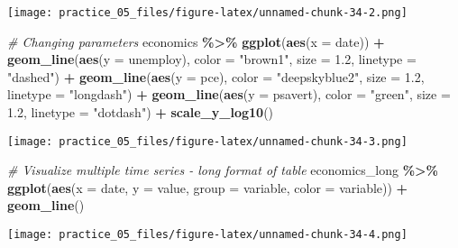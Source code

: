 \documentclass[
]{article}
\newenvironment{Shaded}{\begin{snugshade}}{\end{snugshade}}
\newcommand{\AttributeTok}[1]{\textcolor[rgb]{0.13,0.29,0.53}{#1}}
\newcommand{\CommentTok}[1]{\textcolor[rgb]{0.56,0.35,0.01}{\textit{#1}}}
\newcommand{\FloatTok}[1]{\textcolor[rgb]{0.00,0.00,0.81}{#1}}
\newcommand{\FunctionTok}[1]{\textcolor[rgb]{0.13,0.29,0.53}{\textbf{#1}}}
\newcommand{\NormalTok}[1]{#1}
\newcommand{\SpecialCharTok}[1]{\textcolor[rgb]{0.81,0.36,0.00}{\textbf{#1}}}
\newcommand{\StringTok}[1]{\textcolor[rgb]{0.31,0.60,0.02}{#1}}
\begin{document}
\texttt{[image: practice\_05\_files/figure-latex/unnamed-chunk-34-2.png]}

\begin{Shaded}
\begin{Highlighting}[]
\CommentTok{\# Changing parameters}
\NormalTok{economics }\SpecialCharTok{\%\textgreater{}\%} 
  \FunctionTok{ggplot}\NormalTok{(}\FunctionTok{aes}\NormalTok{(}\AttributeTok{x =}\NormalTok{ date)) }\SpecialCharTok{+}
  \FunctionTok{geom\_line}\NormalTok{(}\FunctionTok{aes}\NormalTok{(}\AttributeTok{y =}\NormalTok{ unemploy), }\AttributeTok{color =} \StringTok{"brown1"}\NormalTok{, }\AttributeTok{size =} \FloatTok{1.2}\NormalTok{, }\AttributeTok{linetype =} \StringTok{"dashed"}\NormalTok{) }\SpecialCharTok{+}
  \FunctionTok{geom\_line}\NormalTok{(}\FunctionTok{aes}\NormalTok{(}\AttributeTok{y =}\NormalTok{ pce),      }\AttributeTok{color =} \StringTok{"deepskyblue2"}\NormalTok{, }\AttributeTok{size =} \FloatTok{1.2}\NormalTok{, }\AttributeTok{linetype =} \StringTok{"longdash"}\NormalTok{) }\SpecialCharTok{+}
  \FunctionTok{geom\_line}\NormalTok{(}\FunctionTok{aes}\NormalTok{(}\AttributeTok{y =}\NormalTok{ psavert),  }\AttributeTok{color =} \StringTok{"green"}\NormalTok{, }\AttributeTok{size =} \FloatTok{1.2}\NormalTok{, }\AttributeTok{linetype =} \StringTok{"dotdash"}\NormalTok{) }\SpecialCharTok{+}
  \FunctionTok{scale\_y\_log10}\NormalTok{()}
\end{Highlighting}
\end{Shaded}

\texttt{[image: practice\_05\_files/figure-latex/unnamed-chunk-34-3.png]}

\begin{Shaded}
\begin{Highlighting}[]
\CommentTok{\# Visualize multiple time series {-} long format of table}
\NormalTok{economics\_long }\SpecialCharTok{\%\textgreater{}\%} 
  \FunctionTok{ggplot}\NormalTok{(}\FunctionTok{aes}\NormalTok{(}\AttributeTok{x =}\NormalTok{ date,}
             \AttributeTok{y =}\NormalTok{ value,}
             \AttributeTok{group =}\NormalTok{ variable,}
             \AttributeTok{color =}\NormalTok{ variable)) }\SpecialCharTok{+}
  \FunctionTok{geom\_line}\NormalTok{()}
\end{Highlighting}
\end{Shaded}

\texttt{[image: practice\_05\_files/figure-latex/unnamed-chunk-34-4.png]}
\end{document}
